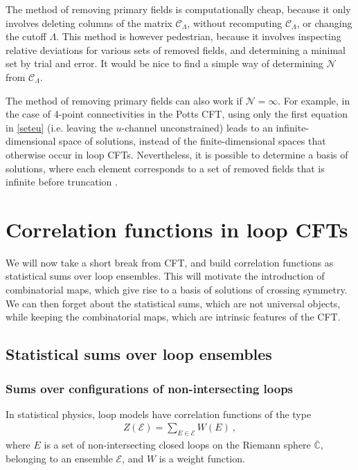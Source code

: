 \documentclass[12pt, a4paper]{article}
\theoremstyle{break}
\begin{document}
The method of removing primary fields is computationally cheap, because it only involves deleting columns of the matrix $\mathcal{C}_\Lambda$, without recomputing $\mathcal{C}_\Lambda$, or changing the cutoff $\Lambda$. This method is however pedestrian, because it involves inspecting relative deviations for various sets of removed fields, and determining a minimal set by trial and error. It would be nice to find a simple way of determining $\mathcal{N}$ from $\mathcal{C}_\Lambda$. 

The method of removing primary fields can also work if $\mathcal{N}=\infty$. For example, in the case of 4-point connectivities in the Potts CFT, using only the first equation in \eqref{seteu} (i.e. leaving the $u$-channel unconstrained) leads to an infinite-dimensional space of solutions, instead of the finite-dimensional spaces that otherwise occur in loop CFTs. Nevertheless, it is possible to determine a basis of solutions, where each element corresponds to a set of removed fields that is infinite before truncation \cite{nr20}.


\section{Correlation functions in loop CFTs} \label{sec:cloop}

We will now take a short break from CFT, and build correlation functions as statistical sums over loop ensembles. This will motivate the introduction of combinatorial maps, which give rise to a basis of solutions of crossing symmetry. We can then forget about the statistical sums, which are not universal objects, while keeping the combinatorial maps, which are intrinsic features of the CFT.

\subsection{Statistical sums over loop ensembles}

\subsubsection{Sums over configurations of non-intersecting loops}

In statistical physics, loop models have correlation functions of the type
\begin{align}
 Z(\mathcal{E}) = \sum_{E\in\mathcal{E}} W(E)\ , 
\end{align}
where $E$ is a set of non-intersecting closed loops on the Riemann sphere $\overline{\mathbb{C}}$, belonging to an ensemble $\mathcal{E}$, and $W$ is a weight function. 
\end{document}
